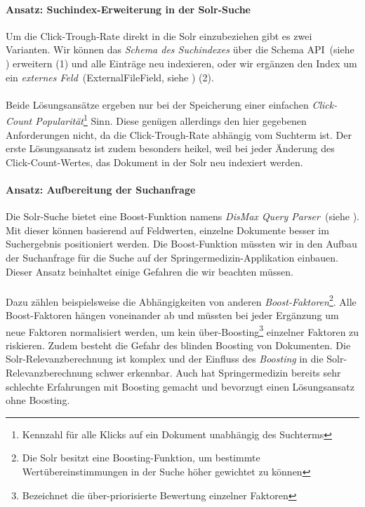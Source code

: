 \paragraph{Ansatz: Suchindex-Erweiterung in der Solr-Suche}
Um die Click-Trough-Rate direkt in die Solr einzubeziehen gibt es zwei Varianten. Wir können das \textit{Schema des Suchindexes} über die Schema API~(siehe \cite{SchemaAPISolr}) erweitern (1) und alle Einträge neu indexieren, oder wir ergänzen den Index um ein \textit{externes Feld}~(ExternalFileField, siehe \cite{ExtFieldSolr}) (2).
\\
\\
Beide Lösungsansätze ergeben nur bei der Speicherung einer einfachen \textit{Click-Count Popularität}\footnote{Kennzahl für alle Klicks auf ein Dokument unabhängig des Suchterms} Sinn. Diese genügen allerdings den hier gegebenen Anforderungen nicht, da die Click-Trough-Rate abhängig vom Suchterm ist. Der erste Lösungsansatz ist zudem besonders heikel, weil bei jeder Änderung des Click-Count-Wertes, das Dokument in der Solr neu indexiert werden.

\paragraph{Ansatz: Aufbereitung der Suchanfrage} Die Solr-Suche bietet eine Boost-Funktion namens \textit{DisMax Query Parser}~(siehe \cite{DisMax}). Mit dieser können basierend auf Feldwerten, einzelne Dokumente besser im Suchergebnis positioniert werden. Die Boost-Funktion müssten wir in den Aufbau der Suchanfrage für die Suche auf der Springermedizin-Applikation einbauen. Dieser Ansatz beinhaltet einige Gefahren die wir beachten müssen.
\\
\\
Dazu zählen beispielsweise die Abhängigkeiten von anderen \textit{Boost-Faktoren}\footnote{Die Solr besitzt eine Boosting-Funktion, um bestimmte Wertübereinstimmungen in der Suche höher gewichtet zu können}. Alle Boost-Faktoren hängen voneinander ab und müssten bei jeder Ergänzung um neue Faktoren normalisiert werden, um kein \glqq über-Boosting\grqq{}\footnote{Bezeichnet die über-priorisierte Bewertung einzelner Faktoren} einzelner Faktoren zu riskieren. Zudem besteht die Gefahr des \glqq blinden Boosting\grqq{} von Dokumenten. Die Solr-Relevanzberechnung ist komplex und der Einfluss des \textit{Boosting} in die Solr-Relevanzberechnung schwer erkennbar. Auch hat Springermedizin bereits sehr schlechte Erfahrungen mit Boosting gemacht und bevorzugt einen Lösungsansatz ohne Boosting.


